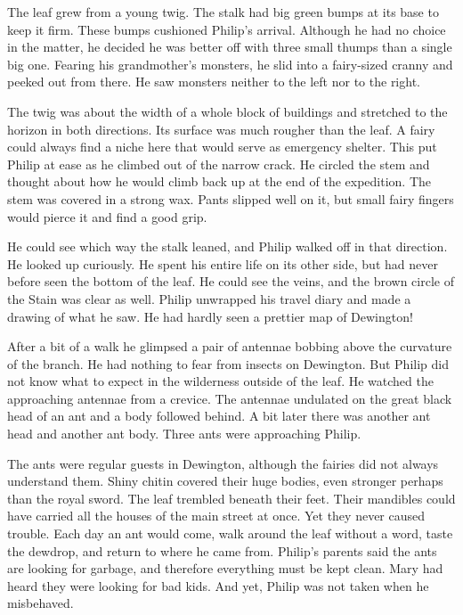 \documentclass[10pt, draft]{memoir}
\begin{document}
The leaf grew from a young twig. The stalk had big green bumps at its base to keep it firm. These bumps cushioned Philip's arrival. Although he had no choice in the matter, he decided he was better off with three small thumps than a single big one. Fearing his grandmother's monsters, he slid into a fairy-sized cranny and peeked out from there. He saw monsters neither to the left nor to the right.

The twig was about the width of a whole block of buildings and stretched to the horizon in both directions. Its surface was much rougher than the leaf. A fairy could always find a niche here that would serve as emergency shelter. This put Philip at ease as he climbed out of the narrow crack. He circled the stem and thought about how he would climb back up at the end of the expedition. The stem was covered in a strong wax. Pants slipped well on it, but small fairy fingers would pierce it and find a good grip.

He could see which way the stalk leaned, and Philip walked off in that direction. He looked up curiously. He spent his entire life on its other side, but had never before seen the bottom of the leaf. He could see the veins, and the brown circle of the Stain was clear as well. Philip unwrapped his travel diary and made a drawing of what he saw. He had hardly seen a prettier map of Dewington!

After a bit of a walk he glimpsed a pair of antennae bobbing above the curvature of the branch. He had nothing to fear from insects on Dewington. But Philip did not know what to expect in the wilderness outside of the leaf. He watched the approaching antennae from a crevice. The antennae undulated on the great black head of an ant and a body followed behind. A bit later there was another ant head and another ant body. Three ants were approaching Philip.

The ants were regular guests in Dewington, although the fairies did not always understand them. Shiny chitin covered their huge bodies, even stronger perhaps than the royal sword. The leaf trembled beneath their feet. Their mandibles could have carried all the houses of the main street at once. Yet they never caused trouble. Each day an ant would come, walk around the leaf without a word, taste the dewdrop, and return to where he came from. Philip's parents said the ants are looking for garbage, and therefore everything must be kept clean. Mary had heard they were looking for bad kids. And yet, Philip was not taken when he misbehaved.
\end{document}
